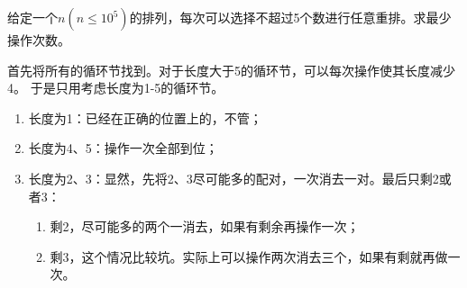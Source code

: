 \begin{prob}
	给定一个$n(n \le 10^5)$的排列，每次可以选择不超过5个数进行任意重排。求最少操作次数。
\end{prob}

\begin{sol}
	首先将所有的循环节找到。对于长度大于5的循环节，可以每次操作使其长度减少4。
	于是只用考虑长度为1-5的循环节。
	\begin{enumerate}
		\item 长度为1：已经在正确的位置上的，不管；
		\item 长度为4、5：操作一次全部到位；
		\item 长度为2、3：显然，先将2、3尽可能多的配对，一次消去一对。最后只剩2或者3：
			\begin{enumerate}
				\item 剩2，尽可能多的两个一消去，如果有剩余再操作一次；
				\item 剩3，这个情况比较坑。实际上可以操作两次消去三个，如果有剩就再做一次。
			\end{enumerate}
	\end{enumerate}
\end{sol}
